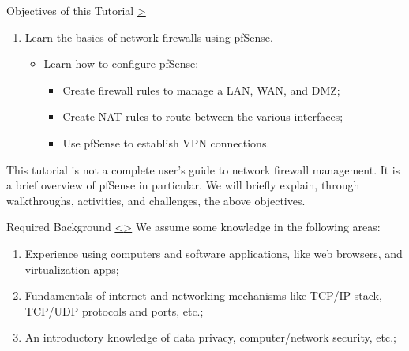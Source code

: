 \documentclass[12pt]{extarticle}
\newenvironment{instructionblock}{\Large\bgroup}{\egroup}
\newcommand{\ben}{\begin{enumerate}}
\newcommand{\een}{\end{enumerate}}
\begin{document}
\pagebreak
{}
\setcounter{section}{1}






\begin{slide}{ Objectives of this Tutorial }{ \hyperref[slide 2]{\textgreater} }
	\begin{instructionblock}
		\ben
			\item Learn the basics of network firewalls using pfSense.
			\begin{itemize}
			\item Learn how to configure pfSense:
			\begin{itemize}
			    \item Create firewall rules to manage a LAN, WAN, and DMZ;
			    \item Create NAT rules to route between the various interfaces;
			    \item Use pfSense to establish VPN connections.
			\end{itemize}
			\end{itemize}
		\een
	\end{instructionblock}
\end{slide}


\vspace{8mm}
\noindent
This tutorial is not a complete user's guide to network firewall management. It is a brief overview of pfSense in particular. We will briefly explain, through walkthroughs, activities, and challenges, the above objectives.








\pagebreak	
\begin{slide}{ Required Background }{ \hyperref[slide 1]{\textless}\hyperref[slide 3]{\textgreater} }
	\begin{instructionblock}
		We assume some knowledge in the following areas:
		\begin{enumerate}
			\item Experience using computers and software applications, like web browsers, and virtualization apps;
			\item Fundamentals of internet and networking mechanisms like TCP/IP stack, TCP/UDP protocols and ports, etc.;
			\item An introductory knowledge of data privacy, computer/network security, etc.;
		\end{enumerate}
	\end{instructionblock}
\end{slide}
\end{document}
